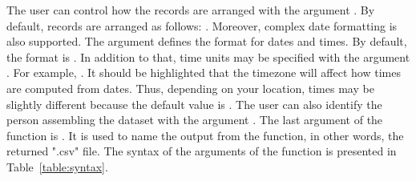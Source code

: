 The user can control how the records are arranged with the argument . By default, records are arranged as follows: . Moreover, complex date formatting is also supported. The argument  defines the format for dates and times. By default, the format is . In addition to that, time units may be specified with the argument  . For example, . It should be highlighted that the timezone will affect how times are computed from dates. Thus, depending on your location, times may be slightly different because the default value is . The user can also identify the person assembling the dataset with the argument . The last argument of the  function is . It is used to name the output from the function, in other words, the returned ".csv" file. The syntax of the arguments of the   function is presented in Table~\ref{table:syntax}.

